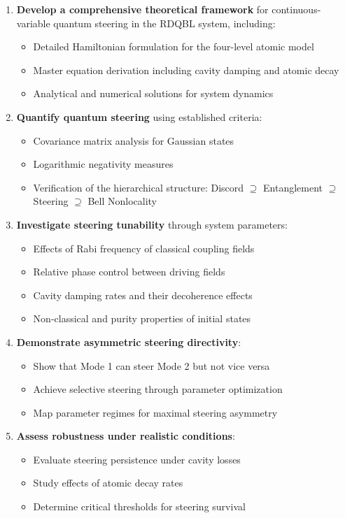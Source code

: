 \begin{enumerate}
	\item \textbf{Develop a comprehensive theoretical framework} for continuous-variable quantum steering in the RDQBL system, including:
	\begin{itemize}
		\item Detailed Hamiltonian formulation for the four-level atomic model
		\item Master equation derivation including cavity damping and atomic decay
		\item Analytical and numerical solutions for system dynamics
	\end{itemize}

	\item \textbf{Quantify quantum steering} using established criteria:
	\begin{itemize}
		\item Covariance matrix analysis for Gaussian states
		\item Logarithmic negativity measures
		\item Verification of the hierarchical structure: Discord $\supseteq$ Entanglement $\supseteq$ Steering $\supseteq$ Bell Nonlocality
	\end{itemize}

	\item \textbf{Investigate steering tunability} through system parameters:
	\begin{itemize}
		\item Effects of Rabi frequency of classical coupling fields
		\item Relative phase control between driving fields
		\item Cavity damping rates and their decoherence effects
		\item Non-classical and purity properties of initial states
	\end{itemize}

	\item \textbf{Demonstrate asymmetric steering directivity}:
	\begin{itemize}
		\item Show that Mode 1 can steer Mode 2 but not vice versa
		\item Achieve selective steering through parameter optimization
		\item Map parameter regimes for maximal steering asymmetry
	\end{itemize}

	\item \textbf{Assess robustness under realistic conditions}:
	\begin{itemize}
		\item Evaluate steering persistence under cavity losses
		\item Study effects of atomic decay rates
		\item Determine critical thresholds for steering survival
	\end{itemize}
\end{enumerate}

